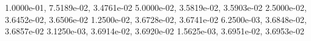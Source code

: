 1.0000e-01, 7.5189e-02, 3.4761e-02
5.0000e-02, 3.5819e-02, 3.5903e-02
2.5000e-02, 3.6452e-02, 3.6506e-02
1.2500e-02, 3.6728e-02, 3.6741e-02
6.2500e-03, 3.6848e-02, 3.6857e-02
3.1250e-03, 3.6914e-02, 3.6920e-02
1.5625e-03, 3.6951e-02, 3.6953e-02
